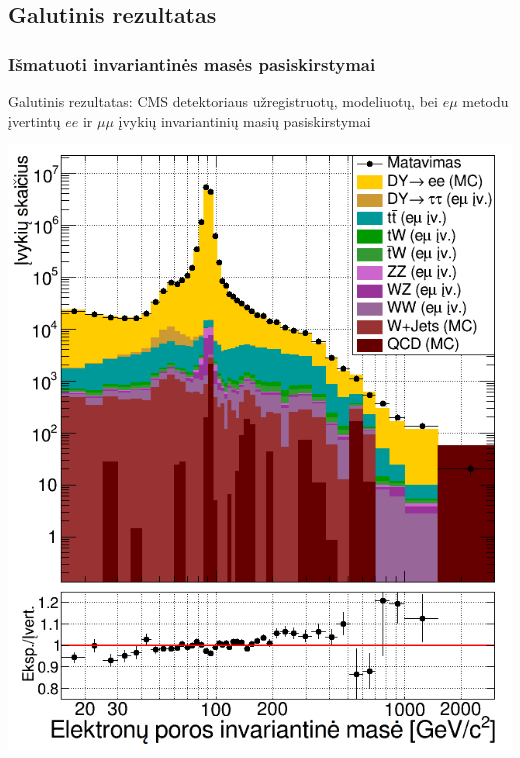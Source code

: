 \documentclass[xcolor=dvipsnames]{beamer}
\newcommand{\emu}{\mathit{e}\mu}
\newcommand{\ee}{\mathit{ee}}
\newcommand{\mumu}{\mu\mu}
\begin{document}
\begin{frame}
	\section{Galutinis rezultatas}
	\frametitle{Išmatuoti invariantinės masės pasiskirstymai}
	Galutinis rezultatas: CMS detektoriaus užregistruotų, modeliuotų, bei $\emu$ metodu įvertintų $\ee$ ir $\mumu$ įvykių
	invariantinių masių pasiskirstymai
	\begin{minipage}{0.49\textwidth}
		\includegraphics[width=\textwidth]{eeMassFinal_SMALL.png}
	\end{minipage}
	\hfill
	\begin{minipage}{0.49\textwidth}

\end{minipage}
\end{frame}
\end{document}
